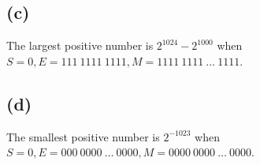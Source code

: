 \documentclass{exam}
\begin{document}
\subsection*{(c)}
The largest positive number is $2^{1024} - 2^{1000}$ when $S = 0, E = 111\ 1111\ 1111, M = 1111\ 1111\ \dots\ 1111$.

\subsection*{(d)}
The smallest positive number is $2^{-1023}$ when $S = 0, E = 000\ 0000\ \dots\ 0000, M = 0000\ 0000\ \dots\ 0000$.
\end{document}
